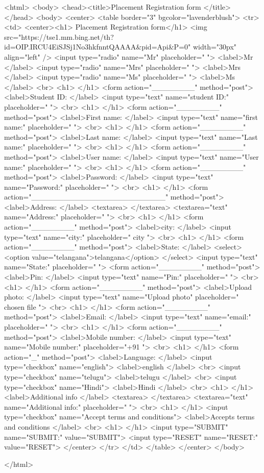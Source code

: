 <html>
<body>
<head><title>Placement Registration form </title>
</head>
<body>
<center>
<table border="3" bgcolor="lavenderblush">
<tr> <td>
<center><h1> Placement Registration form</h1>
<img src="https://tse1.mm.bing.net/th?id=OIP.IRCU4EiSJSj1No3hkfnntQAAAA&pid=Api&P=0" width="30px" align="left" />
<input type="radio" name="Mr" placeholder="  ">
<label>Mr </label>
<input type="radio" name="Mrs" placeholder="  ">
<label>Mrs </label>
<input type="radio" name="Ms" placeholder="  ">
<label>Ms </label>
<br>
<h1> </h1>
<form action="________" method="post">
<label>Student ID: </label>
<input type="text" name="student ID:" placeholder="  ">
<br>
<h1>  </h1>
<form action="________" method="post">
<label>First name: </label>
<input type="text" name="first name:" placeholder="  ">
<br>
<h1> </h1>
<form action="________" method="post">
<label>Last name: </label>
<input type="text" name="Last name:" placeholder="  ">
<br>
<h1>  </h1>
<form action="________" method="post">
<label>User name: </label>
<input type="text" name="User name:" placeholder="  ">
<br>
<h1>  </h1>
<form action="________" method="post">
<label>Password: </label>
<input type="text" name="Password:" placeholder="  ">
<br>
<h1>  </h1>
<form action="_________________________" method="post">
<label>Address: </label>
<textarea>  </textarea>
<textarea="text" name="Address:" placeholder="  ">
<br>
<h1>  </h1>
<form action="________" method="post">
<label>city: </label>
<input type="text" name="city:" placeholder=" city ">
<br>
<h1>  </h1>
<form action="________" method="post">
<label>State: </label>
<select> <option value="telangana">telangana</option>  </select>
<input type="text" name="State:" placeholder="  ">
<form action="________" method="post">
<label>Pin: </label>
<input type="text" name="Pin:" placeholder="  ">
<br>
<h1>  </h1>
<form action="________" method="post">
<label>Upload photo: </label>
<input type="text" name="Upload photo" placeholder=" chosen file  ">
<br>
<h1>  </h1>
<form action="________" method="post">
<label>Email: </label>
<input type="text" name="email:" placeholder="  ">
<br>
<h1>  </h1>
<form action="________" method="post">
<label>Mobile number: </label>
<input type="text" name="Mobile number:" placeholder="+91  ">
<br>
<h1>  </h1>
<form action="_" method="post">
<label>Language: </label>
<input type="checkbox" name="english">
<label>english </label>
<br>
<input type="checkbox" name="telugu">
<label>telugu </label>
<br>
<input type="checkbox" name="Hindi">
<label>Hindi </label>
<br>
<h1>  </h1>
<label>Additional info </label>
<textarea>  </textarea>
<textarea="text" name="Additional info:" placeholder="  ">
<br>
<h1> </h1>
<input type="checkbox" name="Accept terms and conditions">
<label>Accepts terms and conditions </label>
<br>
<h1> </h1>
<input type="SUBMIT" name="SUBMIT:" value="SUBMIT">
<input type="RESET" name="RESET:" value="RESET">
</center>
</tr> </td> </table>
</center>
</body>

</html>